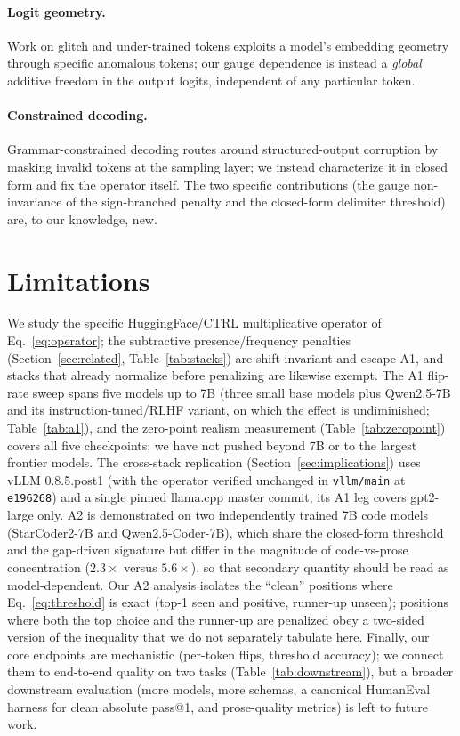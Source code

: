 \documentclass[11pt]{article}
\makeatletter
\newcommand{\code}[1]{\texttt{#1}}
\newcommand{\passk}[1]{pass@#1}
\makeatother
\begin{document}
\paragraph{Logit geometry.} Work on glitch and under-trained tokens \citep{land2024magikarp}
exploits a model's embedding geometry through specific anomalous tokens; our gauge dependence is
instead a \emph{global} additive freedom in the output logits, independent of any particular
token.

\paragraph{Constrained decoding.} Grammar-constrained decoding \citep{willard2023outlines} routes
around structured-output corruption by masking invalid tokens at the sampling layer; we instead
characterize it in closed form and fix the operator itself. The two specific contributions (the
gauge non-invariance of the sign-branched penalty and the closed-form delimiter threshold) are,
to our knowledge, new.

\section{Limitations}
\label{sec:limitations}

We study the specific HuggingFace/CTRL multiplicative operator of Eq.~\eqref{eq:operator}; the
subtractive presence/frequency penalties (Section~\ref{sec:related}, Table~\ref{tab:stacks})
are shift-invariant and escape A1, and stacks that already normalize before penalizing are
likewise exempt. The A1 flip-rate sweep spans five models up to 7B (three small base models
plus Qwen2.5-7B and its instruction-tuned/RLHF variant, on which the effect is undiminished;
Table~\ref{tab:a1}), and the zero-point realism measurement (Table~\ref{tab:zeropoint})
covers all five checkpoints; we have not pushed beyond 7B or to the largest frontier models. The
cross-stack replication (Section~\ref{sec:implications}) uses vLLM 0.8.5.post1 (with the
operator verified unchanged in \code{vllm/main} at \code{e196268}) and a single pinned
llama.cpp master commit; its A1 leg covers gpt2-large only. A2
is demonstrated on two independently trained 7B code models (StarCoder2-7B and
Qwen2.5-Coder-7B), which share the closed-form threshold and the gap-driven signature but
differ in the magnitude of code-vs-prose concentration ($2.3\times$ versus $5.6\times$), so
that secondary quantity should be read as model-dependent. Our A2 analysis isolates the
``clean'' positions where Eq.~\eqref{eq:threshold} is exact (top-1 seen and positive,
runner-up unseen); positions where both the top choice and the runner-up are penalized obey a
two-sided version of the inequality that we do not separately tabulate here. Finally, our
core endpoints are mechanistic (per-token flips, threshold accuracy); we connect them to
end-to-end quality on two tasks (Table~\ref{tab:downstream}), but a broader downstream
evaluation (more models, more schemas, a canonical HumanEval harness for clean absolute
\passk{1}, and prose-quality metrics) is left to future work.
\end{document}
